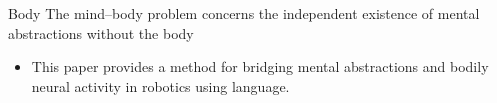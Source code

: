\section{}
    \begin{frame}[allowframebreaks]{Body}
        The mind--body problem concerns the independent existence of mental abstractions without the body \cite{georgiev-2020-quantum-information-theoretic-approach-to-the-mind-brain-problem}

        \begin{itemize}
            \item This paper provides a method for bridging mental abstractions and bodily neural activity in robotics using language.
        \end{itemize}
    \end{frame}
    \subsection{}
     
